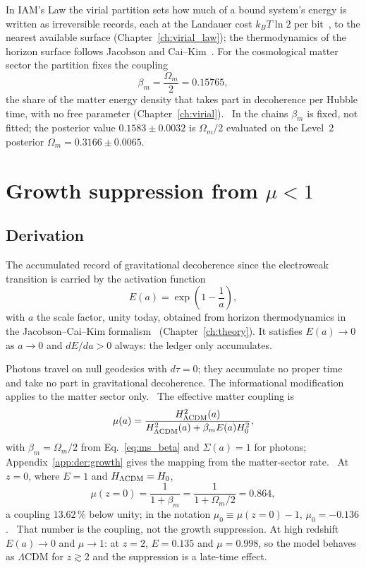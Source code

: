 In IAM's Law the virial partition sets how much of a bound system's energy is written as irreversible records, each at the Landauer cost $k_BT\ln2$
per bit~\cite{Landauer1961}, to the nearest available surface (Chapter~\ref{ch:virial_law}); the thermodynamics of the horizon surface follows Jacobson
and Cai--Kim~\cite{Jacobson1995,CaiKim2005}. For the cosmological matter sector the partition fixes the coupling
\begin{equation}
\beta_m=\frac{\Omega_m}{2}=0.15765,
\label{eq:ms_beta}\end{equation}
the share of the matter energy density that takes part in decoherence per Hubble time, with no free parameter (Chapter~\ref{ch:virial}). \prediction\
In the chains $\beta_m$ is fixed, not fitted; the posterior value $0.1583\pm0.0032$ is $\Omega_m/2$ evaluated on the Level~2 posterior
$\Omega_m=0.3166\pm0.0065$. \calc

\section{Growth suppression from $\mu<1$}\label{sec:ms_A}
\subsection{Derivation}
The accumulated record of gravitational decoherence since the electroweak transition is carried by the activation function
\begin{equation}
E(a)=\exp\!\left(1-\frac1a\right),
\label{eq:ms_E}\end{equation}
with $a$ the scale factor, unity today, obtained from horizon thermodynamics in the Jacobson--Cai--Kim formalism~\cite{Jacobson1995,CaiKim2005}
(Chapter~\ref{ch:theory}). It satisfies $E(a)\to0$ as $a\to0$ and $dE/da>0$ always: the ledger only accumulates. \interp

Photons travel on null geodesics with $d\tau=0$; they accumulate no proper time and take no part in gravitational decoherence. The informational
modification applies to the matter sector only. \interp\ The effective matter coupling is
\begin{equation}
\mu(a)=\frac{H^2_{\Lambda\rm CDM}(a)}{H^2_{\Lambda\rm CDM}(a)+\beta_mE(a)H_0^2},
\label{eq:ms_mu}\end{equation}
with $\beta_m=\Omega_m/2$ from Eq.~\eqref{eq:ms_beta} and $\Sigma(a)=1$ for photons; Appendix~\ref{app:der:growth} gives the mapping from the
matter-sector rate. \interp\ At $z=0$, where $E=1$ and $H_{\Lambda\rm CDM}=H_0$,
\begin{equation}
\mu(z=0)=\frac1{1+\beta_m}=\frac1{1+\Omega_m/2}=0.864,
\label{eq:ms_mu0}\end{equation}
a coupling $13.62\,\%$ below unity; in the notation $\mu_0\equiv\mu(z=0)-1$, $\mu_0=-0.136$. \calc\ That number is the coupling, not the growth
suppression. At high redshift $E(a)\to0$ and $\mu\to1$: at $z=2$, $E=0.135$ and $\mu=0.998$, so the model behaves as $\Lambda$CDM for $z\gtrsim2$ and
the suppression is a late-time effect. \calc

